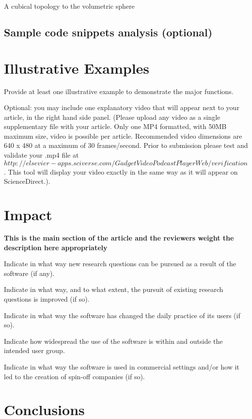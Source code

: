 \documentclass[preprint,12pt, a4paper]{elsarticle}
\begin{document}
A cubical topology to the volumetric sphere  \cite{cobb1988tts}

\subsection{Sample code snippets analysis (optional)}
\label{}

\section{Illustrative Examples}
\label{}

Provide at least one illustrative example to demonstrate the major functions.

Optional: you may include one explanatory video that will appear next to your article, in the right hand side panel. (Please upload any video as a single supplementary file with your article. Only one MP4 formatted, with 50MB maximum size, video is possible per article. Recommended video dimensions are 640 x 480 at a maximum of 30 frames/second. Prior to submission please test and validate your .mp4 file at $ http://elsevier-apps.sciverse.com/GadgetVideoPodcastPlayerWeb/verification$. This tool will display your video exactly in the same way as it will appear on ScienceDirect.).

\section{Impact}
\label{}

\textbf{This is the main section of the article and the reviewers weight the description here appropriately}

Indicate in what way new research questions can be pursued as a result of the software (if any).

Indicate in what way, and to what extent, the pursuit of existing research questions is improved (if so).

Indicate in what way the software has changed the daily practice of its users (if so).

Indicate how widespread the use of the software is within and outside the intended user group.

Indicate in what way the software is used in commercial settings and/or how it led to the creation of spin-off companies (if so).

\section{Conclusions}
\label{}
\end{document}
